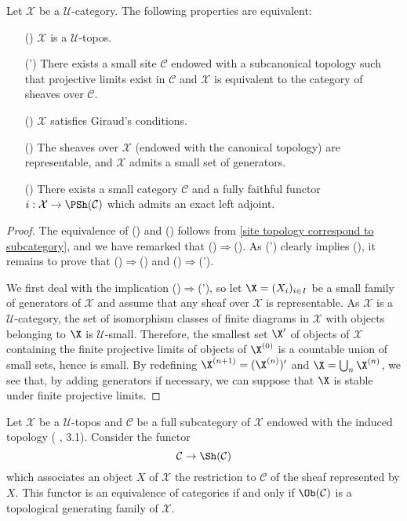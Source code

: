 \begin{theorem}\label{topos Giraud characterization}
Let $\mathcal{X}$ be a $\mathscr{U}$-category. The following properties are equivalent:
\begin{enumerate}
\item[(\rmnum{1})] $\mathcal{X}$ is a $\mathscr{U}$-topos.
\item[(\rmnum{1}')] There exists a small site $\mathcal{C}$ endowed with a subcanonical topology such that projective limits exist in $\mathcal{C}$ and $\mathcal{X}$ is equivalent to the category of sheaves over $\mathcal{C}$.
\item[(\rmnum{2})] $\mathcal{X}$ satisfies Giraud's conditions.
\item[(\rmnum{3})] The sheaves over $\mathcal{X}$ (endowed with the canonical topology) are representable, and $\mathcal{X}$ admits a small set of generators.
\item[(\rmnum{4})] There exists a small category $\mathcal{C}$ and a fully faithful functor $i:\mathcal{X}\to \PSh(\mathcal{C})$ which admits an exact left adjoint.
\end{enumerate}
\end{theorem}
\begin{proof}
The equivalence of () and () follows from \cref{site topology correspond to subcategory}, and we have remarked that ()$\Rightarrow$(). As (') clearly implies (), it remains to prove that ()$\Rightarrow$() and ()$\Rightarrow$(').\par
We first deal with the implication ()$\Rightarrow$('), so let $\X=(X_i)_{i\in I}$ be a small family of generators of $\mathcal{X}$ and assume that any sheaf over $\mathcal{X}$ is representable. As $\mathcal{X}$ is a $\mathscr{U}$-category, the set of isomorphism classes of finite diagrams in $\mathcal{X}$ with objects belonging to $\X$ is $\mathscr{U}$-small. Therefore, the smallest set $\X'$ of objects of $\mathcal{X}$ containing the finite projective limits of objects of $\X^{(0)}$ is a countable union of small sets, hence is small. By redefining $\X^{(n+1)}=(\X^{(n)})'$ and $\X=\bigcup_n\X^{(n)}$, we see that, by adding generators if necessary, we can suppose that $\X$ is stable under finite projective limits.
\end{proof}
\begin{corollary}\label{topos subcategory sheaf cat equivalent iff generating}
Let $\mathcal{X}$ be a $\mathscr{U}$-topos and $\mathcal{C}$ be a full subcategory of $\mathcal{X}$ endowed with the induced topology (\cite{SGA4-1} , 3.1). Consider the functor
\[\mathcal{C}\to \Sh(\mathcal{C})\]
which associates an object $X$ of $\mathcal{X}$ the restriction to $\mathcal{C}$ of the sheaf represented by $X$. This functor is an equivalence of categories if and only if $\Ob(\mathcal{C})$ is a topological generating family of $\mathcal{X}$.
\end{corollary}
